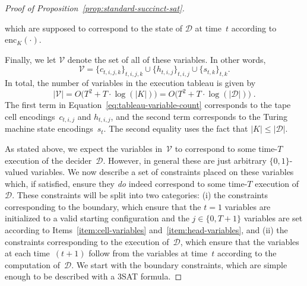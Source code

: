 \documentclass[11pt]{article}
\theoremstyle{definition}
\newcommand{\decider}{\mathcal{D}}
\begin{document}
\begin{proof}[Proof of Proposition~\ref{prop:standard-succinct-sat}]
\begin{enumerate}
\begin{equation*}
    \end{equation*}
    which are supposed to correspond to the state of $\decider$ at time~$t$
    according to $\mathrm{enc}_K(\cdot)$.
  \end{enumerate}
  Finally, we let $\mathcal{V}$ denote the set of all of these variables.
  In other words,
  \begin{equation*}
    \mathcal{V} = \{c_{t, i, j, k}\}_{t, i, j, k} \cup \{h_{t, i, j}\}_{t, i, j}
    \cup \{s_{t, k}\}_{t, k}.
  \end{equation*}
  In total, the number of variables in the execution tableau is given by
  \begin{equation}\label{eq:tableau-variable-count}
    |\mathcal{V}|
    = O\big(T^2 + T \cdot \log(|K|)\big)
    = O\big(T^2 + T \cdot \log(|\decider|)\big)\;.
  \end{equation}
  The first term in Equation~\eqref{eq:tableau-variable-count}
  corresponds to the tape cell encodings~$c_{t, i, j}$ and $h_{t, i, j}$,
  and the second term corresponds to the Turing machine state encodings~$s_t$.
  The second equality uses the fact that $|K| \leq |\decider|$.

  As stated above, we expect the variables in~$\mathcal{V}$ to correspond to
  some time-$T$ execution of the decider~$\decider$.
  However, in general these are just arbitrary $\{0, 1\}$-valued variables.
  We now describe a set of constraints placed on these variables which, if
  satisfied, ensure they \emph{do} indeed correspond to some time-$T$ execution
  of~$\decider$.
  These constraints will be split into two categories: (i) the constraints
  corresponding to the boundary, which ensure that the $t=1$ variables are
  initialized to a valid starting configuration and the $j \in \{0, T+1\}$
  variables are set according to Items~\ref{item:cell-variables}
  and~\ref{item:head-variables}, and (ii) the constraints corresponding to the
  execution of~$\decider$, which ensure that the variables at each time~$(t+1)$
  follow from the variables at time~$t$ according to the computation
  of~$\decider$.
  We start with the boundary constraints, which are simple enough to be
  described with a 3SAT formula.


\end{proof}
\end{document}
